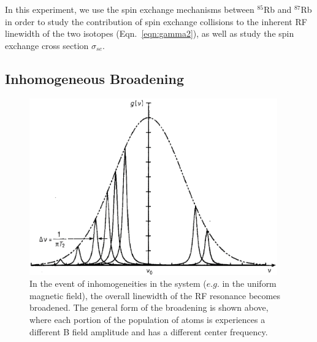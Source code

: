 In this experiment, we use the spin exchange mechanisms between
$^{85}$Rb and $^{87}$Rb in order to study the contribution of spin
exchange collisions to the inherent RF linewidth of the two isotopes
(Eqn.~\ref{eqn:gamma2}), as well as study the spin exchange cross
section $\sigma_{se}$.

\subsection{Inhomogeneous Broadening}


\begin{figure}[h]
\begin{center}
\includegraphics[height=3in]{figures/inhomogeneous.eps}
\caption{\small{In the event of inhomogeneities in the system ($e.g.$ in the uniform magnetic field), the overall linewidth of the RF resonance becomes broadened. The general form of the broadening is shown above, where each portion of the population of atoms is experiences a different B field amplitude and has a different center frequency.}}
\label{fig:inhomo}
\end{center}
\end{figure}


